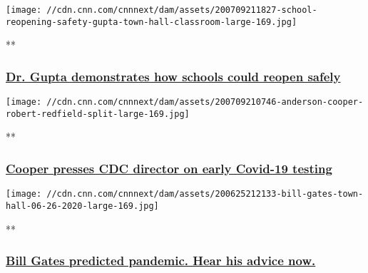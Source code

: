 \href{/videos/health/2020/07/10/school-reopening-safety-sanjay-gupta-coronavirus-town-hall-sot-vpx.cnn/video/playlists/cnn-coronavirus-town-hall/}{}

\texttt{[image: //cdn.cnn.com/cnnnext/dam/assets/200709211827-school-reopening-safety-gupta-town-hall-classroom-large-169.jpg]}

**

\hypertarget{dr-gupta-demonstrates-how-schools-could-reopen-safely}{%
\subsubsection{\texorpdfstring{\href{/videos/health/2020/07/10/school-reopening-safety-sanjay-gupta-coronavirus-town-hall-sot-vpx.cnn/video/playlists/cnn-coronavirus-town-hall/}{Dr.
Gupta demonstrates how schools could reopen
safely}}{Dr. Gupta demonstrates how schools could reopen safely}}\label{dr-gupta-demonstrates-how-schools-could-reopen-safely}}

\href{/videos/health/2020/07/10/robert-redfield-coronavirus-test-cooper-town-hall-sot-vpx.cnn/video/playlists/cnn-coronavirus-town-hall/}{}

\texttt{[image: //cdn.cnn.com/cnnnext/dam/assets/200709210746-anderson-cooper-robert-redfield-split-large-169.jpg]}

**

\hypertarget{cooper-presses-cdc-director-on-early-covid-19-testing}{%
\subsubsection{\texorpdfstring{\href{/videos/health/2020/07/10/robert-redfield-coronavirus-test-cooper-town-hall-sot-vpx.cnn/video/playlists/cnn-coronavirus-town-hall/}{Cooper
presses CDC director on early Covid-19
testing}}{Cooper presses CDC director on early Covid-19 testing}}\label{cooper-presses-cdc-director-on-early-covid-19-testing}}

\href{/videos/health/2020/06/26/bill-gates-virus-prediction-advice-town-hall-vpx.cnn/video/playlists/cnn-coronavirus-town-hall/}{}

\texttt{[image: //cdn.cnn.com/cnnnext/dam/assets/200625212133-bill-gates-town-hall-06-26-2020-large-169.jpg]}

**

\hypertarget{bill-gates-predicted-pandemic-hear-his-advice-now}{%
\subsubsection{\texorpdfstring{\href{/videos/health/2020/06/26/bill-gates-virus-prediction-advice-town-hall-vpx.cnn/video/playlists/cnn-coronavirus-town-hall/}{Bill
Gates predicted pandemic. Hear his advice
now.}}{Bill Gates predicted pandemic. Hear his advice now.}}\label{bill-gates-predicted-pandemic-hear-his-advice-now}}

